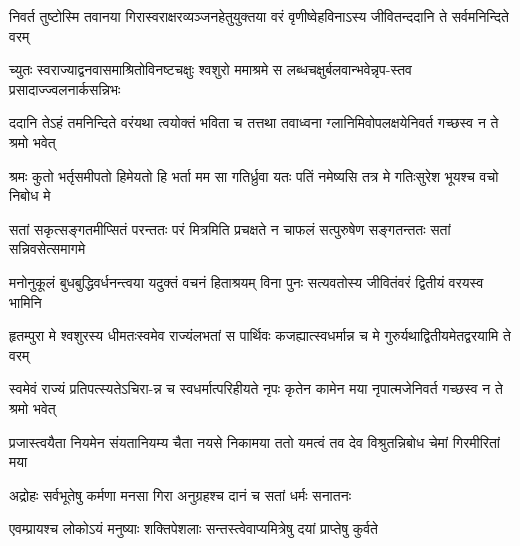 


\twolineshloka
{निवर्त तुष्टोस्मि तवानया गिरास्वराक्षरव्यञ्जनहेतुयुक्तया}
{वरं वृणीष्वेहविनाऽस्य जीवितन्ददानि ते सर्वमनिन्दिते वरम्}




\twolineshloka
{च्युतः स्वराज्याद्वनवासमाश्रितोविनष्टचक्षुः श्वशुरो ममाश्रमे}
{स लब्धचक्षुर्बलवान्भवेन्नृप-स्तव प्रसादाज्ज्वलनार्कसन्निभः}




\twolineshloka
{ददानि तेऽहं तमनिन्दिते वरंयथा त्वयोक्तं भविता च तत्तथा}
{तवाध्वना ग्लानिमिवोपलक्षयेनिवर्त गच्छस्व न ते श्रमो भवेत्}




\twolineshloka
{श्रमः कुतो भर्तृसमीपतो हिमेयतो हि भर्ता मम सा गतिर्ध्रुवा}
{यतः पतिं नमेष्यसि तत्र मे गतिःसुरेश भूयश्च वचो निबोध मे}


\twolineshloka
{सतां सकृत्सङ्गतमीप्सितं परन्ततः परं मित्रमिति प्रचक्षते}
{न चाफलं सत्पुरुषेण सङ्गतन्ततः सतां सन्निवसेत्समागमे}




\twolineshloka
{मनोनुकूलं बुधबुद्धिवर्धनन्त्वया यदुक्तं वचनं हिताश्रयम्}
{विना पुनः सत्यवतोस्य जीवितंवरं द्वितीयं वरयस्व भामिनि}




\twolineshloka
{हृतम्पुरा मे श्वशुरस्य धीमतःस्वमेव राज्यंलभतां स पार्थिवः}
{कजह्यात्स्वधर्मान्न च मे गुरुर्यथाद्वितीयमेतद्वरयामि ते वरम्}




\twolineshloka
{स्वमेवं राज्यं प्रतिपत्स्यतेऽचिरा-न्न च स्वधर्मात्परिहीयते नृपः}
{कृतेन कामेन मया नृपात्मजेनिवर्त गच्छस्व न ते श्रमो भवेत्}




\twolineshloka
{प्रजास्त्वयैता नियमेन संयतानियम्य चैता नयसे निकामया}
{ततो यमत्वं तव देव विश्रुतन्निबोध चेमां गिरमीरितां मया}


\twolineshloka
{अद्रोहः सर्वभूतेषु कर्मणा मनसा गिरा}
{अनुग्रहश्च दानं च सतां धर्मः सनातनः}


\twolineshloka
{एवम्प्रायश्च लोकोऽयं मनुष्याः शक्तिपेशलाः}
{सन्तस्त्वेवाप्यमित्रेषु दयां प्राप्तेषु कुर्वते}

